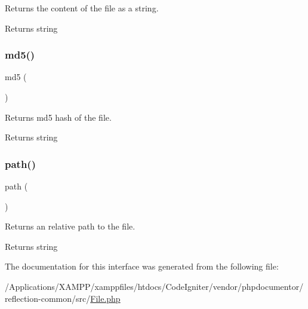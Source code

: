 Returns the content of the file as a string.

\begin{DoxyReturn}{Returns}
string 
\end{DoxyReturn}
\mbox{\label{interfacephp_documentor_1_1_reflection_1_1_file_a63b637e71bf8bbee33889ae833423560}} 
\subsubsection{\texorpdfstring{md5()}{md5()}}
{\footnotesize\ttfamily md5 (\begin{DoxyParamCaption}{ }\end{DoxyParamCaption})}

Returns md5 hash of the file.

\begin{DoxyReturn}{Returns}
string 
\end{DoxyReturn}
\mbox{\label{interfacephp_documentor_1_1_reflection_1_1_file_a3b05eec13add53df44e232273d718ae4}} 
\subsubsection{\texorpdfstring{path()}{path()}}
{\footnotesize\ttfamily path (\begin{DoxyParamCaption}{ }\end{DoxyParamCaption})}

Returns an relative path to the file.

\begin{DoxyReturn}{Returns}
string 
\end{DoxyReturn}


The documentation for this interface was generated from the following file\+:\begin{DoxyCompactItemize}
\item 
/\+Applications/\+X\+A\+M\+P\+P/xamppfiles/htdocs/\+Code\+Igniter/vendor/phpdocumentor/reflection-\/common/src/\mbox{\hyperlink{phpdocumentor_2reflection-common_2src_2_file_8php}{File.\+php}}\end{DoxyCompactItemize}

